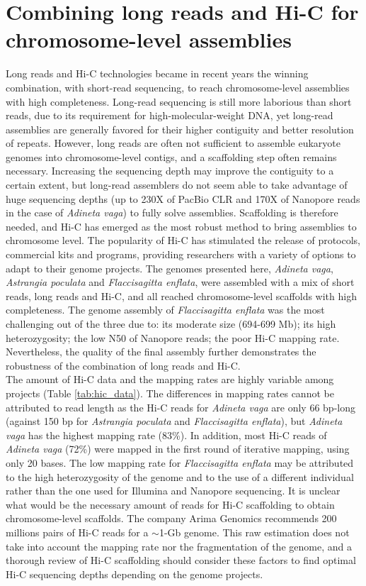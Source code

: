 \section{Combining long reads and Hi-C for chromosome-level assemblies}

Long reads and Hi-C technologies became in recent years the winning combination, with short-read sequencing, to reach chromosome-level assemblies with high completeness. Long-read sequencing is still more laborious than short reads, due to its requirement for high-molecular-weight DNA, yet long-read assemblies are generally favored for their higher contiguity and better resolution of repeats. However, long reads are often not sufficient to assemble eukaryote genomes into chromosome-level contigs, and a scaffolding step often remains necessary. Increasing the sequencing depth may improve the contiguity to a certain extent, but long-read assemblers do not seem able to take advantage of huge sequencing depths (up to 230X of PacBio CLR and 170X of Nanopore reads in the case of \textit{Adineta vaga}) to fully solve assemblies. Scaffolding is therefore needed, and Hi-C has emerged as the most robust method to bring assemblies to chromosome level. The popularity of Hi-C has stimulated the release of protocols, commercial kits and programs, providing researchers with a variety of options to adapt to their genome projects. The genomes presented here, \textit{Adineta vaga}, \textit{Astrangia poculata} and \textit{Flaccisagitta enflata}, were assembled with a mix of short reads, long reads and Hi-C, and all reached chromosome-level scaffolds with high completeness. The genome assembly of \textit{Flaccisagitta enflata} was the most challenging out of the three due to: its moderate size (694-699 Mb); its high heterozygosity; the low N50 of Nanopore reads; the poor Hi-C mapping rate. Nevertheless, the quality of the final assembly further demonstrates the robustness of the combination of long reads and Hi-C. \\

The amount of Hi-C data and the mapping rates are highly variable among projects (Table \ref{tab:hic_data}). The differences in mapping rates cannot be attributed to read length as the Hi-C reads for \textit{Adineta vaga} are only 66 bp-long (against 150 bp for \textit{Astrangia poculata} and \textit{Flaccisagitta enflata}), but \textit{Adineta vaga} has the highest mapping rate (83\%). In addition, most Hi-C reads of \textit{Adineta vaga} (72\%) were mapped in the first round of iterative mapping, using only 20 bases. The low mapping rate for \textit{Flaccisagitta enflata} may be attributed to the high heterozygosity of the genome and to the use of a different individual rather than the one used for Illumina and Nanopore sequencing. It is unclear what would be the necessary amount of reads for Hi-C scaffolding to obtain chromosome-level scaffolds. The company Arima Genomics recommends 200 millions pairs of Hi-C reads for a $\sim$1-Gb genome. This raw estimation does not take into account the mapping rate nor the fragmentation of the genome, and a thorough review of Hi-C scaffolding should consider these factors to find optimal Hi-C sequencing depths depending on the genome projects. \\

